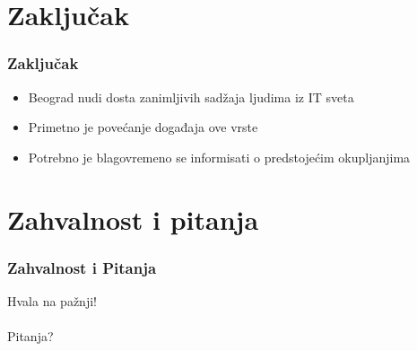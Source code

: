 \documentclass[hyperref={bookmarks=false},aspectratio=169]{beamer}
\begin{document}
\section{Zaključak}

\begin{frame}
\frametitle{Zaključak}

\begin{itemize}
    \item Beograd nudi dosta zanimljivih sadžaja ljudima iz IT sveta
    \item Primetno je povećanje događaja ove vrste
    \item Potrebno je blagovremeno se informisati o predstojećim okupljanjima
\end{itemize}

\end{frame}

\section{Zahvalnost i pitanja}

\begin{frame}
\frametitle{Zahvalnost i Pitanja}

\begin{center}
\Huge{Hvala na pažnji!}
\\ \\
\LARGE{Pitanja?}
\end{center}

\end{frame}
\end{document}
